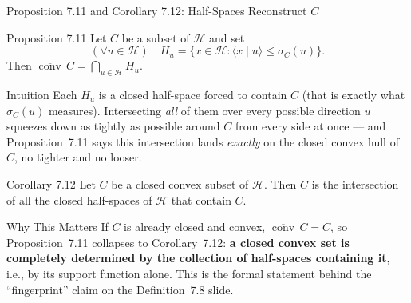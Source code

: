 \documentclass[aspectratio=169,10pt]{beamer}
\DeclareMathOperator{\conv}{conv}
\newcommand{\Hil}{\mathcal{H}}
\newcommand{\ip}[2]{\langle #1 \mid #2 \rangle}
\newcommand{\closure}[1]{\overline{#1}}
\begin{document}
\begin{frame}[allowframebreaks]{Proposition 7.11 and Corollary 7.12: Half-Spaces Reconstruct $C$}

  \begin{block}{Proposition 7.11}
    Let $C$ be a subset of $\Hil$ and set
    \[
      (\forall u \in \Hil) \quad H_u = \{x \in \Hil : \ip{x}{u} \le
      \sigma_C(u)\}. \tag{7.6}
    \]
    Then $\closure{\conv}\,C = \bigcap_{u \in \Hil} H_u$.
  \end{block}

  \begin{block}{Intuition}
    Each $H_u$ is a closed half-space forced to contain $C$ (that is exactly
    what $\sigma_C(u)$ measures). Intersecting \emph{all} of them over every
    possible direction $u$ squeezes down as tightly as possible around $C$
    from every side at once --- and Proposition~7.11 says this intersection
    lands \emph{exactly} on the closed convex hull of $C$, no tighter and no
    looser.
  \end{block}

  \begin{block}{Corollary 7.12}
    Let $C$ be a closed convex subset of $\Hil$. Then $C$ is the intersection
    of all the closed half-spaces of $\Hil$ that contain $C$.
  \end{block}

  \begin{block}{Why This Matters}
    If $C$ is already closed and convex, $\closure{\conv}\,C = C$, so
    Proposition~7.11 collapses to Corollary~7.12: \textbf{a closed convex set
    is completely determined by the collection of half-spaces containing
    it}, i.e., by its support function alone. This is the formal statement
    behind the ``fingerprint'' claim on the Definition~7.8 slide.
  \end{block}

\end{frame}
\end{document}
